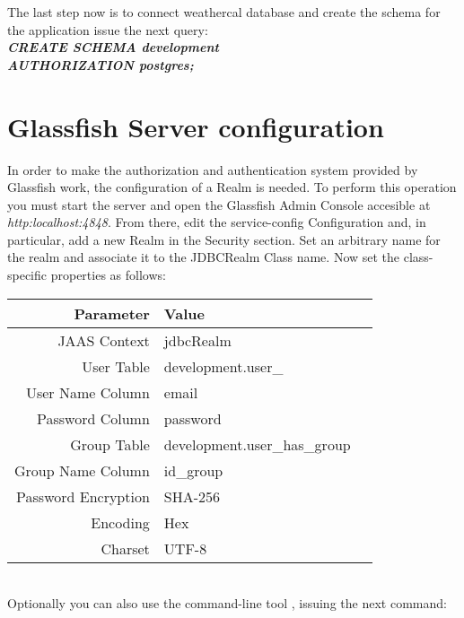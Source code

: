   The last step now is to connect  weathercal database and create the schema for the application issue the next query:\\
  
  {\bf \it CREATE SCHEMA development\\
  AUTHORIZATION postgres;}
  \section{Glassfish Server configuration}
  In order to make the authorization and authentication system provided by Glassfish work, the configuration of a Realm is needed.
 To perform this operation you must start the server and open the Glassfish Admin Console accesible at {\it \\http:localhost:4848}. From there, edit the service-config Configuration and, in particular, add a new Realm in the Security section. Set an arbitrary name for the realm and associate it to the JDBCRealm Class name.
Now set the class-specific properties as follows:
\\
\begin{tabularx}{\linewidth}{|r|X|X|}
\hline  {\bf Parameter} & {\bf Value} \\
\hline   {  JAAS Context} &  jdbcRealm \\
  \hline  { User Table} & development.user\_ \\
  \hline  { User Name Column} & email\\
  \hline  { Password Column} & password\\ 
   \hline  { Group Table} & development.user\_has\_group  \\
   \hline  { Group Name Column} & id\_group        \\
  \hline  { Password Encryption} & SHA-256   \\
  \hline  { Encoding} & Hex \\
  \hline  { Charset} & UTF-8\\
  \hline
\end{tabularx}
\\
Optionally you can also use the command-line tool , issuing the next command:

